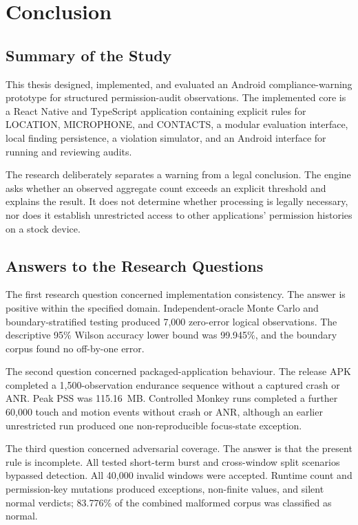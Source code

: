 \newpage
\section{Conclusion}

\subsection{Summary of the Study}

This thesis designed, implemented, and evaluated an Android compliance-warning prototype for structured permission-audit observations. The implemented core is a React Native and TypeScript application containing explicit rules for LOCATION, MICROPHONE, and CONTACTS, a modular evaluation interface, local finding persistence, a violation simulator, and an Android interface for running and reviewing audits.

The research deliberately separates a warning from a legal conclusion. The engine asks whether an observed aggregate count exceeds an explicit threshold and explains the result. It does not determine whether processing is legally necessary, nor does it establish unrestricted access to other applications' permission histories on a stock device.

\subsection{Answers to the Research Questions}

The first research question concerned implementation consistency. The answer is positive within the specified domain. Independent-oracle Monte Carlo and boundary-stratified testing produced 7,000 zero-error logical observations. The descriptive 95\% Wilson accuracy lower bound was 99.945\%, and the boundary corpus found no off-by-one error.

The second question concerned packaged-application behaviour. The release APK completed a 1,500-observation endurance sequence without a captured crash or ANR. Peak PSS was 115.16~MB. Controlled Monkey runs completed a further 60,000 touch and motion events without crash or ANR, although an earlier unrestricted run produced one non-reproducible focus-state exception.

The third question concerned adversarial coverage. The answer is that the present rule is incomplete. All tested short-term burst and cross-window split scenarios bypassed detection. All 40,000 invalid windows were accepted. Runtime count and permission-key mutations produced exceptions, non-finite values, and silent normal verdicts; 83.776\% of the combined malformed corpus was classified as normal.

